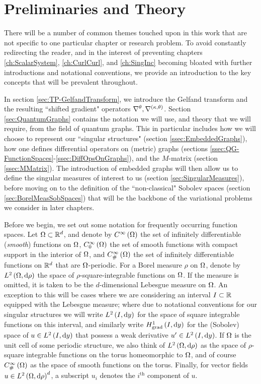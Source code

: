 \chapter{Preliminaries and Theory} \label{ch:TheoryPrelims}
There will be a number of common themes touched upon in this work that are not specific to one particular chapter or research problem.
To avoid constantly redirecting the reader, and in the interest of preventing chapters \ref{ch:ScalarSystem}, \ref{ch:CurlCurl}, and \ref{ch:SingInc} becoming bloated with further introductions and notational conventions, we provide an introduction to the key concepts that will be prevalent throughout.

In section \ref{sec:TP-GelfandTransform}, we introduce the Gelfand transform and the resulting ``shifted gradient" operators $\nabla^{\theta}, \nabla^{\left( \kappa, \theta \right)}$.
Section \ref{sec:QuantumGraphs} contains the notation we will use, and theory that we will require, from the field of quantum graphs.
This in particular includes how we will choose to represent our ``singular structures" (section \ref{ssec:EmbeddedGraphs}), how one defines differential operators on (metric) graphs (sections \ref{ssec:QG-FunctionSpaces}-\ref{ssec:DiffOpsOnGraphs}), and the $M$-matrix (section \ref{ssec:MMatrix}).
The introduction of embedded graphs will then allow us to define the singular measures of interest to us (section \ref{sec:SingularMeasures}), before moving on to the definition of the ``non-classical" Sobolev spaces (section \ref{sec:BorelMeasSobSpaces}) that will be the backbone of the variational problems we consider in later chapters.

Before we begin, we set out some notation for frequently occurring function spaces.
Let $\Omega\subset\mathbb{R}^d$, and denote by $C^{\infty}\left( \Omega \right)$ the set of infinitely differentiable (\emph{smooth}) functions on $\Omega$, $C^{\infty}_{0}\left( \Omega \right)$ the set of smooth functions with compact support in the interior of $\Omega$, and $C^{\infty}_{\#}\left( \Omega \right)$ the set of infinitely differentiable functions on $\mathbb{R}^d$ that are $\Omega$-periodic.
For a Borel measure $\rho$ on $\Omega$, denote by $L^{2}\left( \Omega,\mathrm{d} \rho \right)$ the space of $\rho$-square-integrable functions on $\Omega$.
If the measure is omitted, it is taken to be the $d$-dimensional Lebesgue measure on $\Omega$.
An exception to this will be cases where we are considering an interval $I\subset\mathbb{R}$ equipped with the Lebesgue measure; where due to notational conventions for our singular structures we will write $L^{2}\left( I,\mathrm{d} y \right)$ for the space of square integrable functions on this interval, and similarly write $H^1_\mathrm{grad}\left( I, \mathrm{d}y \right)$ for the (Sobolev) space of $u\in L^{2}\left( I,\mathrm{d} y \right)$ that possess a weak derivative $u'\in L^{2}\left( I,\mathrm{d} y \right)$.
If $\Omega$ is the unit cell of some periodic structure, we also think of $L^{2}\left( \Omega,\mathrm{d} \rho \right)$ as the space of $\rho$-square integrable functions on the torus homeomorphic to $\Omega$, and of course $C^{\infty}_{\#}\left( \Omega \right)$ as the space of smooth functions on the torus.
Finally, for vector fields $u\in L^{2}\left( \Omega,\mathrm{d} \rho \right)^d$, a subscript $u_i$ denotes the $i^{\text{th}}$ component of $u$.









